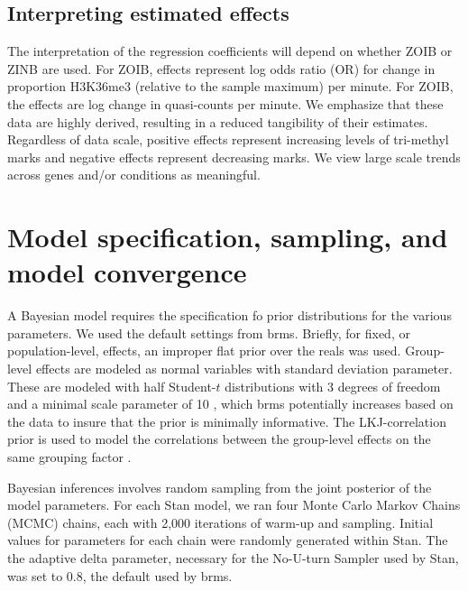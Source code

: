 \documentclass[12pt]{extarticle}
\begin{document}
\subsection*{Interpreting estimated effects}

The interpretation of the regression coefficients will depend on whether ZOIB or ZINB are used. For ZOIB, effects represent log odds ratio (OR) for change in proportion H3K36me3 (relative to the sample maximum) per minute. For ZOIB, the effects are log change in quasi-counts per minute. We emphasize that these data are highly derived, resulting in a reduced tangibility of their estimates. Regardless of data scale, positive effects represent increasing levels of tri-methyl marks and negative effects represent decreasing marks. We view large scale trends across genes and/or conditions as meaningful.

\section*{Model specification, sampling, and model convergence}

A Bayesian model requires the specification fo prior distributions for the various parameters. We used the default settings from brms. Briefly, for fixed, or population-level, effects, an improper flat prior over the reals was used. Group-level effects are modeled as normal variables with standard deviation parameter. These are modeled with half Student-$t$ distributions with 3 degrees of freedom and a minimal scale parameter of 10 \cite{Gelman2006}, which brms potentially increases based on the data to insure that the prior is minimally informative. The LKJ-correlation prior is used to model the correlations between the group-level effects on the same grouping factor \cite{Lewandowski2009}.

Bayesian inferences involves random sampling from the joint posterior of the model parameters. For each Stan model, we ran four Monte Carlo Markov Chains (MCMC) chains, each with 2,000 iterations of warm-up and sampling. Initial values for parameters for each chain were randomly generated within Stan. The the adaptive delta parameter, necessary for the No-U-turn Sampler \cite{Hoffman2014} used by Stan, was set to 0.8, the default used by brms.
\end{document}
